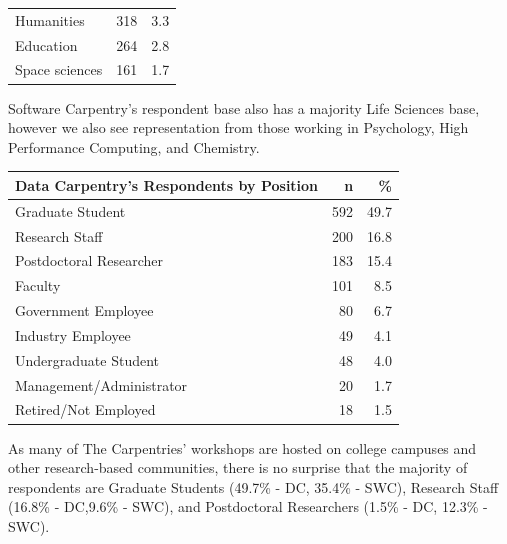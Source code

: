 \documentclass[]{article}
\begin{document}
\begin{longtable}[]{@{}lrr@{}}
\begin{minipage}[t]{0.81\columnwidth}\raggedright\strut
Humanities\strut
\end{minipage} & \begin{minipage}[t]{0.05\columnwidth}\raggedleft\strut
318\strut
\end{minipage} & \begin{minipage}[t]{0.05\columnwidth}\raggedleft\strut
3.3\strut
\end{minipage}\tabularnewline
\begin{minipage}[t]{0.81\columnwidth}\raggedright\strut
Education\strut
\end{minipage} & \begin{minipage}[t]{0.05\columnwidth}\raggedleft\strut
264\strut
\end{minipage} & \begin{minipage}[t]{0.05\columnwidth}\raggedleft\strut
2.8\strut
\end{minipage}\tabularnewline
\begin{minipage}[t]{0.81\columnwidth}\raggedright\strut
Space sciences\strut
\end{minipage} & \begin{minipage}[t]{0.05\columnwidth}\raggedleft\strut
161\strut
\end{minipage} & \begin{minipage}[t]{0.05\columnwidth}\raggedleft\strut
1.7\strut
\end{minipage}\tabularnewline
\bottomrule
\end{longtable}

Software Carpentry's respondent base also has a majority Life Sciences
base, however we also see representation from those working in
Psychology, High Performance Computing, and Chemistry.

\begin{longtable}[]{@{}lrr@{}}
\toprule
Data Carpentry's Respondents by Position & n & \%\tabularnewline
\midrule
\endhead
Graduate Student & 592 & 49.7\tabularnewline
Research Staff & 200 & 16.8\tabularnewline
Postdoctoral Researcher & 183 & 15.4\tabularnewline
Faculty & 101 & 8.5\tabularnewline
Government Employee & 80 & 6.7\tabularnewline
Industry Employee & 49 & 4.1\tabularnewline
Undergraduate Student & 48 & 4.0\tabularnewline
Management/Administrator & 20 & 1.7\tabularnewline
Retired/Not Employed & 18 & 1.5\tabularnewline
\bottomrule
\end{longtable}

As many of The Carpentries' workshops are hosted on college campuses and
other research-based communities, there is no surprise that the majority
of respondents are Graduate Students (49.7\% - DC, 35.4\% - SWC),
Research Staff (16.8\% - DC,9.6\% - SWC), and Postdoctoral Researchers
(1.5\% - DC, 12.3\% - SWC).
\end{document}
